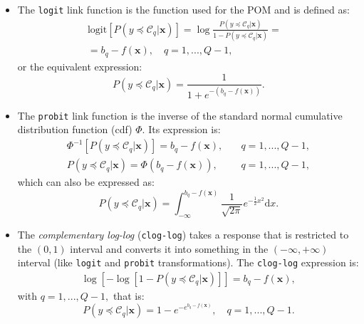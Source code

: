 \documentclass[journal]{IEEEtran}
\begin{document}
	\begin{itemize}
		\item The \texttt{logit} link function is the function used for the POM and is defined as:
		\begin{equation}
		\nonumber
		\begin{aligned}
		\text{logit}[P(y \preceq \mathcal{C}_q | \mathbf{x})] = \log\frac{P(y \preceq \mathcal{C}_q | \mathbf{x})}{1 - P(y \preceq \mathcal{C}_q | \mathbf{x})}=& \\ = b_q - f(\mathbf{x}), \quad q = 1, ..., Q-1,
		\end{aligned}
		\label{eq:logit}
		\end{equation}		
		or the equivalent expression:		
		\begin{equation}
		\nonumber
		P(y \preceq \mathcal{C}_q | \mathbf{x}) = \frac{1}{1 + e^{-(b_q - f(\mathbf{x}))}}.
		\label{eq:logit2}
		\end{equation}
		
		\item The \texttt{probit} link function is the inverse of the standard normal cumulative distribution function (cdf) $\Phi$. Its expression is:
		\begin{equation}
		\nonumber
		\begin{aligned}
		\Phi^{-1}[P(y \preceq \mathcal{C}_q | \mathbf{x})] = b_q - f(\mathbf{x}), \quad &q = 1, ..., Q-1,\\
		P(y \preceq \mathcal{C}_q | \mathbf{x}) = \Phi(b_q - f(\mathbf{x})), \quad &q = 1, ..., Q-1,
		\end{aligned}
		\label{eq:probit}
		\end{equation}		
		which can also be expressed as:
		\begin{equation}
		\nonumber
		P(y \preceq \mathcal{C}_q | \mathbf{x}) = \int_{-\infty}^{b_q - f(\mathbf{x})} \frac{1}{\sqrt{2\pi}} e^{-\frac{1}{2}x^2} \mathrm{d}x.
		\label{eq:probit2}
		\end{equation}
		
		\item The \textit{complementary log-log} (\texttt{clog-log}) takes a response that is restricted to the $(0,1)$ interval and converts it into something in the $(-\infty, +\infty)$ interval (like \texttt{logit} and \texttt{probit} transformations). The \texttt{clog-log} expression is:
		\begin{equation}
		\nonumber
		\begin{aligned}
		\log[-\log[1 - P(y \preceq \mathcal{C}_q | \mathbf{x})]] =b_q - f(\mathbf{x}),
		\end{aligned}
		\label{eq:cloglog}
		\end{equation}
		with $q = 1, ..., Q-1,$ that is:
		\begin{equation}
		\nonumber
		P(y \preceq \mathcal{C}_q | \mathbf{x}) = 1 - e^{-e^{b_q - f(\mathbf{x})}}, \quad q = 1, ..., Q-1.
		\label{eq:cloglog2}
		\end{equation}
	\end{itemize}
	
\end{document}
